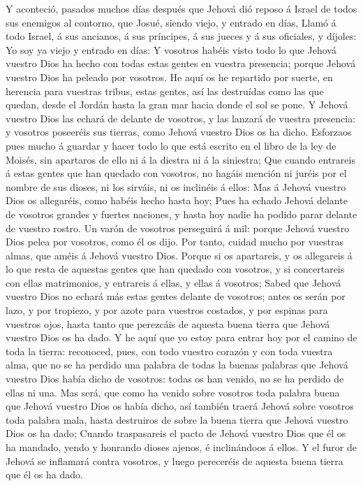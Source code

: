  Y aconteció, pasados muchos días después que Jehová dió
reposo á Israel de todos sus enemigos al contorno, que Josué, siendo
viejo, y entrado en días,  Llamó á todo Israel, á sus
ancianos, á sus príncipes, á sus jueces y á sus oficiales, y díjoles: Yo
soy ya viejo y entrado en días:  Y vosotros habéis visto
todo lo que Jehová vuestro Dios ha hecho con todas estas gentes en
vuestra presencia; porque Jehová vuestro Dios ha peleado por vosotros.
 He aquí os he repartido por suerte, en herencia para
vuestras tribus, estas gentes, así las destruídas como las que quedan,
desde el Jordán hasta la gran mar hacia donde el sol se pone.
 Y Jehová vuestro Dios las echará de delante de vosotros,
y las lanzará de vuestra presencia: y vosotros poseeréis sus tierras,
como Jehová vuestro Dios os ha dicho.  Esforzaos pues
mucho á guardar y hacer todo lo que está escrito en el libro de la ley
de Moisés, sin apartaros de ello ni á la diestra ni á la siniestra;
 Que cuando entrareis á estas gentes que han quedado con
vosotros, no hagáis mención ni juréis por el nombre de sus dioses, ni
los sirváis, ni os inclinéis á ellos:  Mas á Jehová
vuestro Dios os allegaréis, como habéis hecho hasta hoy; 
Pues ha echado Jehová delante de vosotros grandes y fuertes naciones, y
hasta hoy nadie ha podido parar delante de vuestro rostro.
 Un varón de vosotros perseguirá á mil: porque Jehová
vuestro Dios pelea por vosotros, como él os dijo.  Por
tanto, cuidad mucho por vuestras almas, que améis á Jehová vuestro Dios.
 Porque si os apartareis, y os allegareis á lo que resta
de aquestas gentes que han quedado con vosotros, y si concertareis con
ellas matrimonios, y entrareis á ellas, y ellas á vosotros;
 Sabed que Jehová vuestro Dios no echará más estas gentes
delante de vosotros; antes os serán por lazo, y por tropiezo, y por
azote para vuestros costados, y por espinas para vuestros ojos, hasta
tanto que perezcáis de aquesta buena tierra que Jehová vuestro Dios os
ha dado.  Y he aquí que yo estoy para entrar hoy por el
camino de toda la tierra: reconoced, pues, con todo vuestro corazón y
con toda vuestra alma, que no se ha perdido una palabra de todas la
buenas palabras que Jehová vuestro Dios había dicho de vosotros: todas
os han venido, no se ha perdido de ellas ni una.  Mas
será, que como ha venido sobre vosotros toda palabra buena que Jehová
vuestro Dios os había dicho, así también traerá Jehová sobre vosotros
toda palabra mala, hasta destruiros de sobre la buena tierra que Jehová
vuestro Dios os ha dado;  Cuando traspasareis el pacto de
Jehová vuestro Dios que él os ha mandado, yendo y honrando dioses
ajenos, é inclinándoos á ellos. Y el furor de Jehová se inflamará contra
vosotros, y luego pereceréis de aquesta buena tierra que él os ha dado.

